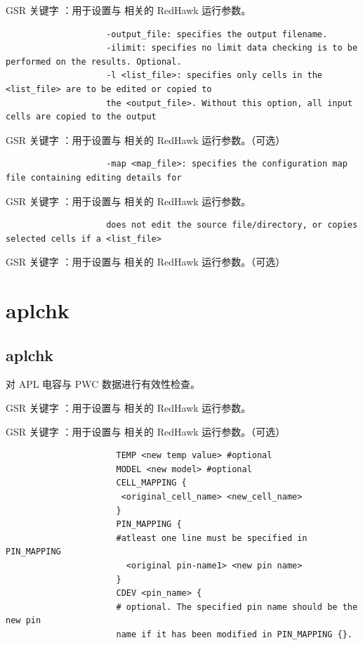 GSR 关键字 ：用于设置与  相关的 RedHawk 运行参数。

\begin{lstlisting}
                    -output_file: specifies the output filename.
                    -ilimit: specifies no limit data checking is to be performed on the results. Optional.
                    -l <list_file>: specifies only cells in the <list_file> are to be edited or copied to
                    the <output_file>. Without this option, all input cells are copied to the output
\end{lstlisting}

GSR 关键字 ：用于设置与  相关的 RedHawk 运行参数。（可选）

\begin{lstlisting}
                    -map <map_file>: specifies the configuration map file containing editing details for
\end{lstlisting}

GSR 关键字 ：用于设置与  相关的 RedHawk 运行参数。

\begin{lstlisting}
                    does not edit the source file/directory, or copies selected cells if a <list_file>
\end{lstlisting}

GSR 关键字 ：用于设置与  相关的 RedHawk 运行参数。（可选）

\section{aplchk}
\subsection*{aplchk}

对 APL 电容与 PWC 数据进行有效性检查。

GSR 关键字 ：用于设置与  相关的 RedHawk 运行参数。

GSR 关键字 ：用于设置与  相关的 RedHawk 运行参数。（可选）

\begin{lstlisting}
                      TEMP <new temp value> #optional
                      MODEL <new model> #optional
                      CELL_MAPPING {
                       <original_cell_name> <new_cell_name>
                      }
                      PIN_MAPPING {
                      #atleast one line must be specified in PIN_MAPPING
                        <original pin-name1> <new pin name>
                      }
                      CDEV <pin_name> {
                      # optional. The specified pin name should be the new pin
                      name if it has been modified in PIN_MAPPING {}.
\end{lstlisting}

